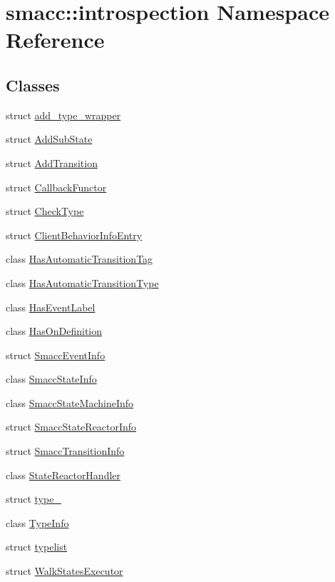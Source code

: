 \hypertarget{namespacesmacc_1_1introspection}{}\section{smacc\+:\+:introspection Namespace Reference}
\label{namespacesmacc_1_1introspection}
\subsection*{Classes}
\begin{DoxyCompactItemize}
\item 
struct \hyperlink{structsmacc_1_1introspection_1_1add__type__wrapper}{add\+\_\+type\+\_\+wrapper}
\item 
struct \hyperlink{structsmacc_1_1introspection_1_1AddSubState}{Add\+Sub\+State}
\item 
struct \hyperlink{structsmacc_1_1introspection_1_1AddTransition}{Add\+Transition}
\item 
struct \hyperlink{structsmacc_1_1introspection_1_1CallbackFunctor}{Callback\+Functor}
\item 
struct \hyperlink{structsmacc_1_1introspection_1_1CheckType}{Check\+Type}
\item 
struct \hyperlink{structsmacc_1_1introspection_1_1ClientBehaviorInfoEntry}{Client\+Behavior\+Info\+Entry}
\item 
class \hyperlink{classsmacc_1_1introspection_1_1HasAutomaticTransitionTag}{Has\+Automatic\+Transition\+Tag}
\item 
class \hyperlink{classsmacc_1_1introspection_1_1HasAutomaticTransitionType}{Has\+Automatic\+Transition\+Type}
\item 
class \hyperlink{classsmacc_1_1introspection_1_1HasEventLabel}{Has\+Event\+Label}
\item 
class \hyperlink{classsmacc_1_1introspection_1_1HasOnDefinition}{Has\+On\+Definition}
\item 
struct \hyperlink{structsmacc_1_1introspection_1_1SmaccEventInfo}{Smacc\+Event\+Info}
\item 
class \hyperlink{classsmacc_1_1introspection_1_1SmaccStateInfo}{Smacc\+State\+Info}
\item 
class \hyperlink{classsmacc_1_1introspection_1_1SmaccStateMachineInfo}{Smacc\+State\+Machine\+Info}
\item 
struct \hyperlink{structsmacc_1_1introspection_1_1SmaccStateReactorInfo}{Smacc\+State\+Reactor\+Info}
\item 
struct \hyperlink{structsmacc_1_1introspection_1_1SmaccTransitionInfo}{Smacc\+Transition\+Info}
\item 
class \hyperlink{classsmacc_1_1introspection_1_1StateReactorHandler}{State\+Reactor\+Handler}
\item 
struct \hyperlink{structsmacc_1_1introspection_1_1type__}{type\+\_\+}
\item 
class \hyperlink{classsmacc_1_1introspection_1_1TypeInfo}{Type\+Info}
\item 
struct \hyperlink{structsmacc_1_1introspection_1_1typelist}{typelist}
\item 
struct \hyperlink{structsmacc_1_1introspection_1_1WalkStatesExecutor}{Walk\+States\+Executor}
\end{DoxyCompactItemize}
